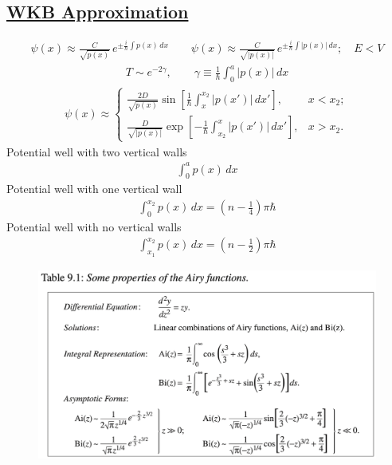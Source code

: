 \newpage
\subsection*{\underline{WKB Approximation}}

\begin{align}
	\psi(x) \approx \frac{C}{\sqrt{p(x)}} \, e^{\pm \frac{i}{\hbar} \int p(x)\, dx}
	\qquad \psi(x) \approx \frac{C}{\sqrt{|p(x)|}} \, e^{\pm \frac{i}{\hbar} \int |p(x)|\, dx}; \quad E < V
\end{align}
\begin{align}
	T \sim e^{-2 \gamma}, \qquad \gamma \equiv \frac{1}{\hbar} \int_0^a |p(x)|\, dx
\end{align}
\begin{align}
	\psi(x) \approx \begin{cases}
		\frac{2D}{\sqrt{p(x)}} \sin{\left[ \frac{1}{\hbar} \int_{x}^{x_2} |p(x')|\, dx' \right]}, & x<x_2 ; \\
		\frac{D}{\sqrt{|p(x)|}} \exp{\left[- \frac{1}{\hbar} \int_{x_2}^x |p(x')|\, dx' \right]}, & x>x_2.
	\end{cases}
\end{align}
Potential well with two vertical walls
\begin{align}
	\int_0^a p(x) \, dx
\end{align}
Potential well with one vertical wall
\begin{align}
	\int_0^{x_2} p(x)\, dx = \left(n - \frac{1}{4} \right) \pi \hbar
\end{align}
Potential well with no vertical walls
\begin{align}
	\int_{x_1}^{x_2} p(x) \, dx = \left( n - \frac{1}{2} \right) \pi \hbar
\end{align}

\begin{figure}
	\includegraphics[width=1\linewidth]{./figures/Airy.png}
	\label{fig:Airy properties}
\end{figure}

